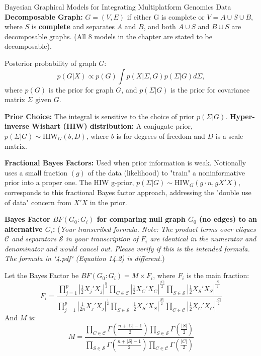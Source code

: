\documentclass[twocolumn]{article}
\begin{document}
\begin{literaturepaper}{Bayesian Graphical Models for Integrating Multiplatform Genomics Data \cite{Wang_Baladandayuthapani_Holmes_Do_2013}}
    \textbf{Decomposable Graph:} $G = (V,E)$ if either G is complete or $V = A \cup S \cup B$, where $S$ is \textbf{complete} and separates $A$ and $B$, and both $A \cup S$ and $B \cup S$ are decomposable graphs. (All 8 models in the chapter are stated to be decomposable).

    Posterior probability of graph $G$:
    \[p(G|X) \propto p(G) \int p(X|\Sigma, G) p(\Sigma|G) d\Sigma,\]
    where $p(G)$ is the prior for graph $G$, and $p(\Sigma|G)$ is the prior for covariance matrix $\Sigma$ given $G$.

    \textbf{Prior Choice:} The integral is sensitive to the choice of prior $p(\Sigma|G)$.
    \textbf{Hyper-inverse Wishart (HIW) distribution:} A conjugate prior, $p(\Sigma|G) \sim \text{HIW}_G(b, D)$, where $b$ is for degrees of freedom and $D$ is a scale matrix.
    
    \textbf{Fractional Bayes Factors:} Used when prior information is weak. Notionally uses a small fraction $(g)$ of the data (likelihood) to "train" a noninformative prior into a proper one.
    The HIW g-prior, $p(\Sigma|G) \sim \text{HIW}_G(g \cdot n, gX'X)$, corresponds to this fractional Bayes factor approach, addressing the "double use of data" concern from $X'X$ in the prior.

    \textbf{Bayes Factor $BF(G_0 : G_i)$ for comparing null graph $G_0$ (no edges) to an alternative $G_i$:}
    (\textit{Your transcribed formula. Note: The product terms over cliques $\mathcal{C}$ and separators $\mathcal{S}$ in your transcription of $F_i$ are identical in the numerator and denominator and would cancel out. Please verify if this is the intended formula. The formula in `4.pdf` (Equation 14.2) is different.})

    Let the Bayes Factor be $BF(G_0 : G_i) = M \times F_i$, where $F_i$ is the main fraction:
    \[ F_i = \frac{\prod_{j=1}^p \left|\frac{1}{2}X_j'X_j\right|^{\frac{n}{2}} \prod_{C \in \mathcal{C}} \left|\frac{1}{2}X_C'X_C\right|^{\frac{|C|}{2}}\prod_{S \in \mathcal{S}} \left|\frac{1}{2}X_S'X_S\right|^{\frac{|S|}{2}}}{\prod_{j=1}^p \left|\frac{1}{2n}X_j'X_j\right|^{\frac{1}{2}} \prod_{S \in \mathcal{S}} \left|\frac{1}{2}X_S'X_S\right|^{\frac{|S|}{2}} \prod_{C \in \mathcal{C}} \left|\frac{1}{2}X_C'X_C\right|^{\frac{|C|}{2}}} \]
    And $M$ is:
    \[ M = \frac{\prod_{C \in \mathcal{C}} \Gamma\left(\frac{n+|C|-1}{2}\right) \prod_{S \in \mathcal{S}} \Gamma\left(\frac{|S|}{2}\right)}{\prod_{S \in \mathcal{S}} \Gamma\left(\frac{n+|S|-1}{2}\right)\prod_{C \in \mathcal{C}} \Gamma\left(\frac{|C|}{2}\right)} \]


\end{literaturepaper}
\end{document}
